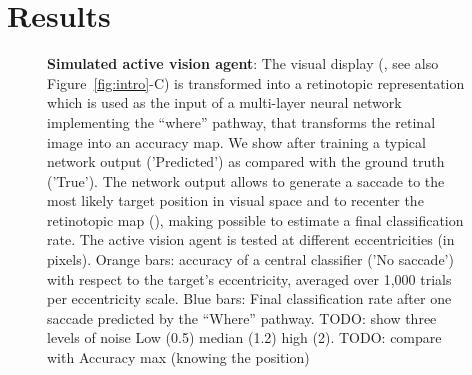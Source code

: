\section{Results}
\label{sec:results}
\begin{figure}[t!]%
\caption{
{\bf Simulated active vision agent}:
\A The visual display (\DIS , see also  Figure~\ref{fig:intro}-C)  is transformed into a retinotopic representation which is used as the input of a multi-layer neural network implementing the ``where'' pathway, that transforms the retinal image into an accuracy map. %
\B We show after training a typical network output  ('Predicted') as compared  with the ground truth ('True'). %
\C The network output allows to generate a saccade to the most likely target position in visual space and to recenter the retinotopic map (\SAC ), making possible to estimate a final classification rate. %
\D The active vision agent is tested at different eccentricities (in pixels). Orange bars: accuracy of a central classifier ('No saccade') with respect to the target's eccentricity, averaged over 1,000 trials per eccentricity scale. Blue bars: Final classification rate after one saccade predicted by the ``Where'' pathway. \ICANN TODO: show three levels of noise Low (0.5) median (1.2) high (2). TODO: compare with Accuracy max (knowing the position)\fi
\label{fig:results}}%
\end{figure}%
\ICANN
\else
